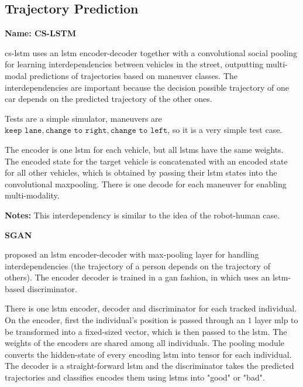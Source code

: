 \subsection{Trajectory Prediction}\label{sec: traj prediction}


\textbf{Name: CS-LSTM}

\cite{deo2018convolutional} \gls{cs-lstm} uses an \gls{lstm} encoder-decoder together with a convolutional social pooling for learning interdependencies between vehicles in the street, outputting multi-modal predictions of trajectories based on maneuver classes.
%
The interdependencies are important because the decision possible trajectory of one car depends on the predicted trajectory of the other ones.

Tests are a simple simulator, maneuvers are ${\texttt{keep lane}, \texttt{change to right}, \texttt{change to left}}$, so it is a very simple test case.

The encoder is one \gls{lstm} for each vehicle, but all \glspl{lstm} have the same weights.
%
The encoded state for the target vehicle is concatenated with an encoded state for all other vehicles, which is obtained by passing their \gls{lstm} states into the convolutional maxpooling.
%
There is one decode for each maneuver for enabling multi-modality.

\textbf{Notes:} This interdependency is similar to the idea of the robot-human case.


\textbf{SGAN}

\cite{gupta2018social} proposed an \gls{lstm} encoder-decoder with max-pooling layer for handling interdependencies (the trajectory of a person depends on the trajectory of others).
%
The encoder decoder is trained in a \gls{gan} fashion, in which uses an \gls{lstm}-based discriminator.

There is one \gls{lstm} encoder, decoder and discriminator for each tracked individual.
%
On the encoder, first the individual's position is passed through an $1$ layer \gls{mlp} to be transformed into a fixed-sized vector, which is then passed to the \gls{lstm}. The weights of the encoders are shared among all individuals.
%
The pooling module converts the hidden-state of every encoding \gls{lstm} into tensor for each individual.
%
The decoder is a straight-forward \gls{lstm} and the discriminator takes the predicted trajectories and classifies encodes them using \glspl{lstm} into "good" or "bad".

